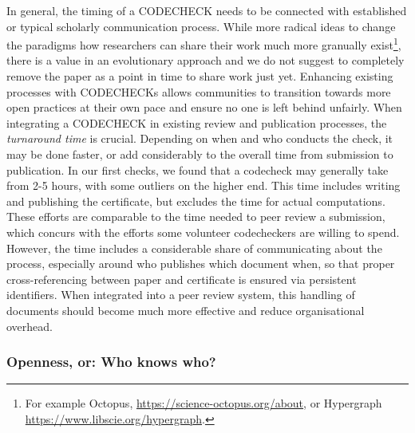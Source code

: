 \documentclass[12pt]{article}
\begin{document}
In general, the timing of a CODECHECK needs to be connected with 
established or typical scholarly communication process.
While more radical ideas to change the paradigms
how researchers can share their work much more granually exist\footnote{
For example Octopus, 
\url{https://science-octopus.org/about}, or Hypergraph
\url{https://www.libscie.org/hypergraph}.},
there is a value in an evolutionary approach and we do not suggest
to completely remove the paper as a point in time to share work just yet.
Enhancing existing processes with CODECHECKs allows communities to 
transition towards more open practices at their own pace and ensure
no one is left behind unfairly.
When integrating a CODECHECK in existing review and publication processes,
the \emph{turnaround time} is crucial. Depending on when and who conducts
the check, it may be done faster, or add considerably to the overall
time from submission to publication.
In our first checks, we found that a codecheck may generally take from 2-5
hours, with some outliers on the higher end. This time includes writing and
publishing the certificate, but excludes the time for actual computations.
These efforts are comparable to the time needed to peer review a submission,
which concurs with the efforts some volunteer codecheckers are willing to
spend.
However, the time includes a considerable share of communicating about the
process,  especially around who publishes which document when, so that proper
cross-referencing between paper and certificate is ensured via persistent
identifiers.
When integrated into a peer review system, this handling of documents should
become much more effective and reduce organisational overhead.

\subsubsection*{Openness, or: Who knows who?}\label{who-knows-who}
\end{document}
